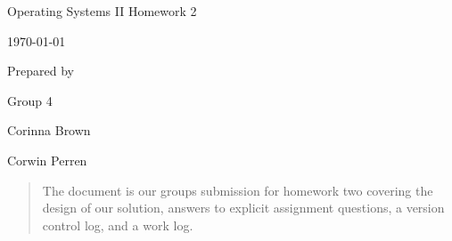 \documentclass[onecolumn, draftclsnofoot, 10pt, compsoc]{IEEEtran}
\newcommand{\NameSigPair}[1]{
  \par
  \makebox[2.75in][r]{#1} 
  \hfill
  \makebox[3.25in]{
      \makebox[2.25in]{\hrulefill} 
      \hfill
      \makebox[.75in]{\hrulefill}
  }
  \par\vspace{-12pt} 
  \textit{
      \tiny\noindent
      \makebox[2.75in]{} 
      \hfill
      \makebox[3.25in]{
          \makebox[2.25in][r]{Signature} 
          \hfill
          \makebox[.75in][r]{Date}
      }
  }
}
\renewcommand{\NameSigPair}[1]{#1}
\begin{document}
\begin{titlepage}
	\begin{singlespace}
		\par\vspace{2in}
		\centering
		\scshape{
			\huge Operating Systems II Homework 2 \par
			{\large\today}\par
			\vspace{.5in}
			\vfill
			\vspace{5pt}
			{\large Prepared by }\par
			Group 4 \par
			\vspace{5pt}
			{\Large
				\NameSigPair{Corinna Brown}\par
				\NameSigPair{Corwin Perren}\par
			}
			\vspace{20pt}
            \begin{abstract}
            The document is our groups submission for homework two covering the design of our solution, answers to explicit assignment questions, a version control log, and a work log.


			\end{abstract}
		}
	\end{singlespace}
\end{titlepage}
\newpage
{}
\tableofcontents
\clearpage





\end{document}
